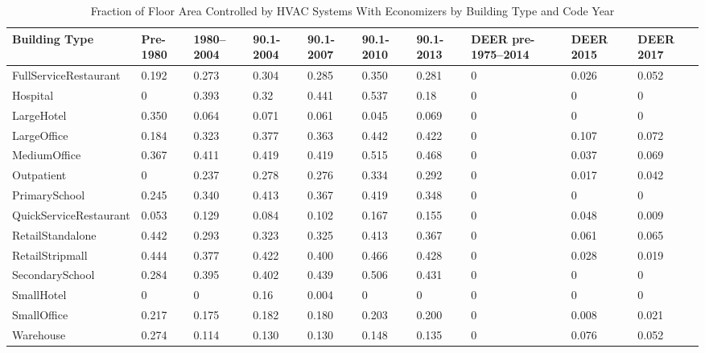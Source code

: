 \begin{table}[h!]
\centering
\small
\caption[Economizer Prevalence]{Fraction of Floor Area Controlled by HVAC Systems With Economizers by Building Type and Code Year}
\label{tab:econ_prev}
\begin{tabular}{|p{2.2cm}|p{0.3in}|p{0.3in}|p{0.3in}|p{0.3in}|p{0.3in}|p{0.3in}|p{0.3in}|p{0.3in}|p{0.3in}|}
\hline
\textbf{Building Type} &
  \textbf{Pre-1980} &
  \textbf{1980--2004} &
  \textbf{90.1-2004} &
  \textbf{90.1-2007} &
  \textbf{90.1-2010} &
  \textbf{90.1-2013} &
  \textbf{DEER pre-1975--2014} &
  \textbf{DEER 2015} &
  \textbf{DEER 2017} \\ \hline
FullService\-Restaurant  & 0.192 & 0.273 & 0.304 & 0.285 & 0.350 & 0.281 & 0 & 0.026 & 0.052 \\ \hline
Hospital               & 0     & 0.393 & 0.32  & 0.441 & 0.537 & 0.18  & 0 & 0     & 0      \\ \hline
LargeHotel             & 0.350 & 0.064 & 0.071 & 0.061 & 0.045 & 0.069 & 0 & 0     & 0     \\ \hline
LargeOffice            & 0.184 & 0.323 & 0.377 & 0.363 & 0.442 & 0.422 & 0 & 0.107 & 0.072 \\ \hline
MediumOffice           & 0.367 & 0.411 & 0.419 & 0.419 & 0.515 & 0.468 & 0 & 0.037 & 0.069 \\ \hline
Outpatient             & 0     & 0.237 & 0.278 & 0.276 & 0.334 & 0.292 & 0 & 0.017 & 0.042 \\ \hline
PrimarySchool          & 0.245 & 0.340 & 0.413 & 0.367 & 0.419 & 0.348 & 0 & 0     & 0     \\ \hline
QuickService\-Restaurant & 0.053 & 0.129 & 0.084 & 0.102 & 0.167 & 0.155 & 0 & 0.048 & 0.009 \\ \hline
RetailStandalone       & 0.442 & 0.293 & 0.323 & 0.325 & 0.413 & 0.367 & 0 & 0.061 & 0.065 \\ \hline
RetailStripmall        & 0.444 & 0.377 & 0.422 & 0.400 & 0.466 & 0.428 & 0 & 0.028 & 0.019 \\ \hline
SecondarySchool        & 0.284 & 0.395 & 0.402 & 0.439 & 0.506 & 0.431 & 0 & 0     & 0     \\ \hline
SmallHotel             & 0     & 0     & 0.16  & 0.004 & 0     & 0     & 0 & 0     & 0     \\ \hline
SmallOffice            & 0.217 & 0.175 & 0.182 & 0.180 & 0.203 & 0.200 & 0 & 0.008 & 0.021 \\ \hline
Warehouse              & 0.274 & 0.114 & 0.130 & 0.130 & 0.148 & 0.135 & 0 & 0.076 & 0.052 \\ \hline
\end{tabular}
\end{table}